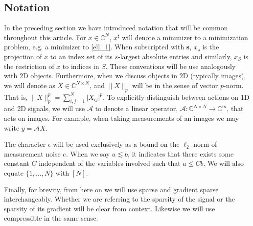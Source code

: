 \documentclass[11pt, oneside]{article}   %
\newcommand{\bC}{\mathbb{C}}
\newcommand{\A}{\mathcal{A}}
\newcommand{\norm}[1]{\lVert #1 \rVert}
\newcommand{\abs}[1]{\lvert#1 \rvert}
\begin{document}
\subsection{Notation}
In the preceding section we have introduced notation that will be common 
throughout this article. For $x \in \bC^N$, $x^\sharp$ will denote a minimizer 
to a minimization problem, e.g. a minimizer to \eqref{ell_1}. When subscripted 
with $\mathbf{s}$, $x_\mathbf{s}$ is the projection of $x$ to an index set of 
its $s$-largest absolute entries and similarly, $x_S$ is the restriction of $x$ to indices in $S$. These conventions will be use analogously with 2D objects.  
Furthermore, when we discuss objects in 2D (typically images), we 
will denote as $X \in \bC^{N\times N}$, and $\norm{X}_p$ will be in 
the sense of vector $p$-norm. That is, $\norm{X}_p^p = 
\sum^N_{i,j=1}\abs{X_{ij}}^p$.  To explicitly distinguish between actions on 1D and 2D signals, we will use $\A$ to denote a linear operator, $\A:\bC^{N\times N} \to \bC^m$, that acts on images. For example, when taking measurements of an images we may write $y = \A X$.

The character $\epsilon$ will be used exclusively as a bound on the $\ell_2$-norm of measurement noise $e$. When we say $a\lesssim b$, it indicates that there exists some constant $C$ independent of the variables involved such that $a \leq Cb$. We will also equate $\{1,\dots, N\}$ with $[N]$. 

Finally, for brevity, from here on  we will use sparse and gradient sparse interchangeably. Whether we are referring to the sparsity of the signal or the sparsity of its gradient will be clear from context. Likewise we will use compressible in the same sense.

\end{document}
